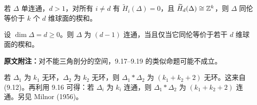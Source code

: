 若 $\Delta$ 单连通，$d>1$，对所有 $i\ne d$ 有 $\widetilde H_i(\Delta)=0$，且 $\widetilde H_d(\Delta)\cong\mathbb Z^k$，则 $\Delta$ 同伦等价于 $k$ 个 $d$ 维球面的楔和。

设 $\dim\Delta=d\ge0$。则 $\Delta$ 为 $(d-1)$ 连通，当且仅当它同伦等价于若干 $d$ 维球面的楔和。

\textbf{原文附注：}对不能三角剖分的空间，9.17--9.19 的类似命题可能不成立。

若 $\Delta_1$ 为 $k_1$ 无环，$\Delta_2$ 为 $k_2$ 无环，则 $\Delta_1*\Delta_2$ 为 $(k_1+k_2+2)$ 无环。这来自 (9.12)。再利用 9.16 可得：若 $\Delta_i$ 为 $k_i$ 连通，则 $\Delta_1*\Delta_2$ 为 $(k_1+k_2+2)$ 连通。另见 Milnor (1956)。
